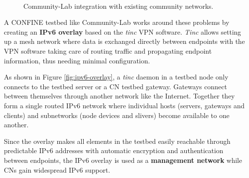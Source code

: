 \documentclass[conference]{IEEEtran}
\begin{document}
\begin{figure}[!t]
 \centering
 \\
 \caption{Community-Lab integration with existing community networks.}
\end{figure}

A CONFINE testbed like Community-Lab works around these problems by creating an \textbf{IPv6
  overlay} based on the \emph{tinc} \cite{tinc} VPN software.  \emph{Tinc}
allows setting up a mesh network where data is exchanged directly between
endpoints with the VPN software taking care of routing traffic and propagating
endpoint information, thus needing minimal configuration.

As shown in Figure \ref{fig:ipv6-overlay}, a \emph{tinc} daemon in a testbed
node only connects to the testbed server or a CN testbed gateway.  Gateways
connect between themselves through another network like the Internet.
Together they form a single routed IPv6 network where individual hosts
(servers, gateways and clients) and subnetworks (node devices and slivers)
become available to one another.

Since the overlay makes all elements in the testbed easily reachable through
predictable IPv6 addresses with automatic encryption and authentication
between endpoints, the IPv6 overlay is used as a \textbf{management network}
while CNs gain widespread IPv6 support.
\end{document}
